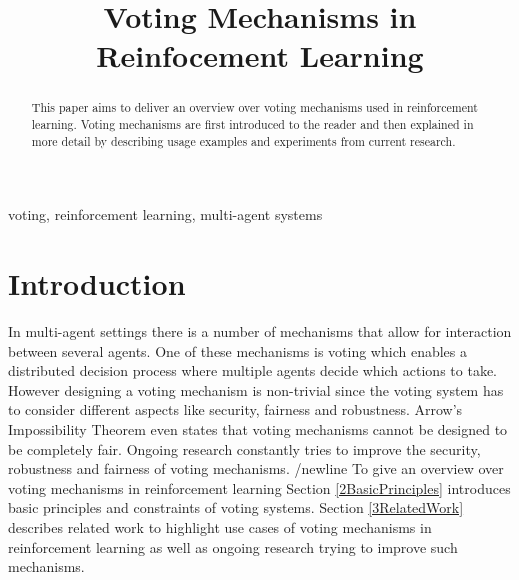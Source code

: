 \documentclass[conference]{IEEEtran}
\begin{document}
\title{Voting Mechanisms in Reinfocement Learning}

\author{
}

\maketitle

\begin{abstract}
This paper aims to deliver an overview over voting mechanisms used in reinforcement learning.
Voting mechanisms are first introduced to the reader and then explained in more detail by
describing usage examples and experiments from current research. 

\end{abstract}

\begin{IEEEkeywords}
voting, reinforcement learning, multi-agent systems
\end{IEEEkeywords}

\section{Introduction}
In multi-agent settings there is a number of mechanisms that allow for interaction between several agents.
One of these mechanisms is voting which enables a distributed decision process where multiple agents decide which actions to take.
However designing a voting mechanism is non-trivial since the voting system has to consider different aspects like security, fairness and robustness.
Arrow's Impossibility Theorem even states that voting mechanisms cannot be designed to be completely fair.
Ongoing research constantly tries to improve the security, robustness and fairness of voting mechanisms.
/newline
To give an overview over voting mechanisms in reinforcement learning Section \ref{2BasicPrinciples} introduces basic principles and constraints of voting systems.
Section \ref{3RelatedWork} describes related work to highlight use cases of voting mechanisms in reinforcement learning as well as ongoing research trying to improve such mechanisms.
\end{document}
